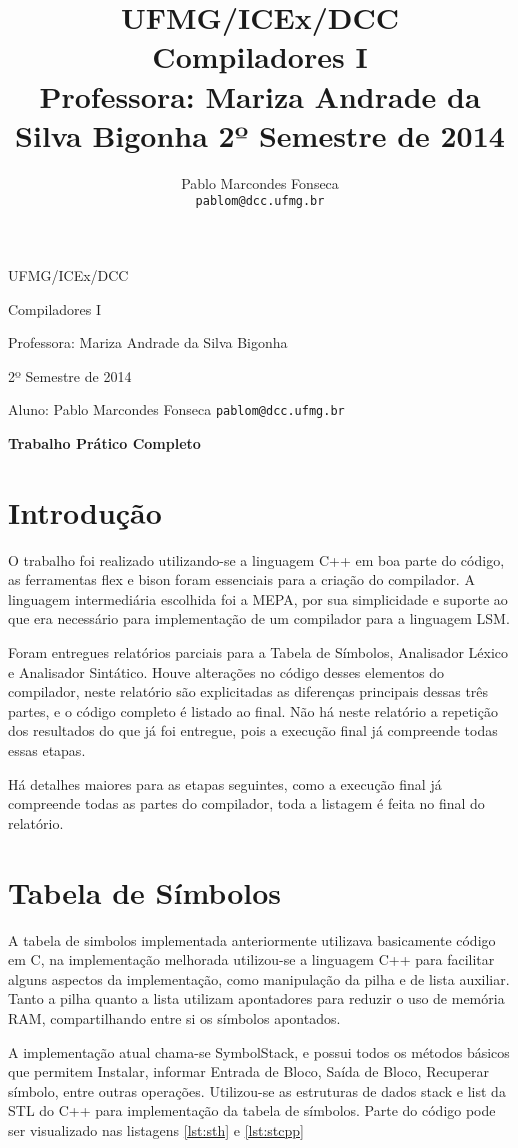 \documentclass[12pt,a4paper]{article}
\title{\Large UFMG/ICEx/DCC\\
\Large Compiladores I\\
\large Professora: Mariza Andrade da Silva Bigonha
\normalsize 2º Semestre de 2014\\
}
\author{Pablo Marcondes Fonseca\\
\texttt{pablom@dcc.ufmg.br}}
\begin{document}
\centerline{\Large UFMG/ICEx/DCC}
\medskip
\centerline{\Large Compiladores I}
\medskip
\centerline{\large Professora: Mariza Andrade da Silva Bigonha}
\medskip
\centerline{\normalsize 2º Semestre de 2014}
\medskip
\centerline{\large Aluno: Pablo Marcondes Fonseca \texttt{pablom@dcc.ufmg.br}}
\bigskip
\centerline{\Large \textbf{Trabalho Prático Completo}}


\section{Introdução}

O trabalho foi realizado utilizando-se a linguagem C++ em boa parte do código, as ferramentas flex e bison foram essenciais para a criação do compilador. A linguagem intermediária escolhida foi a MEPA, por sua simplicidade e suporte ao que era necessário para implementação de um compilador para a linguagem LSM.

Foram entregues relatórios parciais para a Tabela de Símbolos, Analisador Léxico e Analisador Sintático. Houve alterações no código desses elementos do compilador, neste relatório são explicitadas as diferenças principais dessas três partes, e o código completo é listado ao final. Não há neste relatório a repetição dos resultados do que já foi entregue, pois a execução final já compreende todas essas etapas. 

Há detalhes maiores para as etapas seguintes, como a execução final já compreende todas as partes do compilador, toda a listagem é feita no final do relatório.

\section{Tabela de Símbolos}

A tabela de simbolos implementada anteriormente utilizava basicamente código em C, na implementação melhorada utilizou-se a linguagem C++ para facilitar alguns aspectos da implementação, como manipulação da pilha e de lista auxiliar. Tanto a pilha quanto a lista utilizam apontadores para reduzir o uso de memória RAM, compartilhando entre si os símbolos apontados.

A implementação atual chama-se SymbolStack, e possui todos os métodos básicos que permitem Instalar, informar Entrada de Bloco, Saída de Bloco, Recuperar símbolo, entre outras operações. Utilizou-se as estruturas de dados stack e list da STL do C++ para implementação da tabela de símbolos. Parte do código pode ser visualizado nas listagens \ref{lst:sth} e \ref{lst:stcpp}
\end{document}
